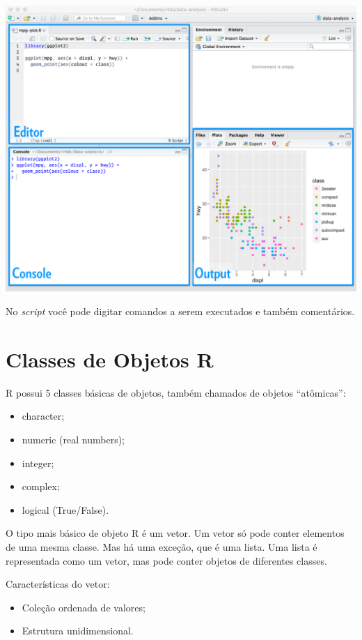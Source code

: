 \documentclass[a4paper]{book}
\begin{document}
\begin{center}\includegraphics[width=0.9\linewidth]{imagens/rstudio-editor} \end{center}

No \emph{script} você pode digitar comandos a serem executados e também comentários.

\hypertarget{classes-de-objetos-r}{%
\section{Classes de Objetos R}\label{classes-de-objetos-r}}

R possui 5 classes básicas de objetos, também chamados de objetos ``atômicas'':

\begin{itemize}
\item
  character;
\item
  numeric (real numbers);
\item
  integer;
\item
  complex;
\item
  logical (True/False).
\end{itemize}

O tipo mais básico de objeto R é um vetor. Um vetor só pode conter elementos de uma mesma classe. Mas há uma exceção, que é uma lista. Uma lista é representada como um vetor, mas pode conter objetos de diferentes classes.

Características do vetor:

\begin{itemize}
\item
  Coleção ordenada de valores;
\item
  Estrutura unidimensional.
\end{itemize}
\end{document}
